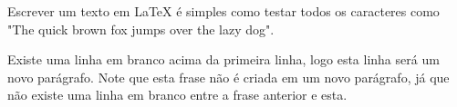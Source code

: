 \documentclass{article}
\begin{document}
	Escrever um texto em LaTeX é simples como testar todos os caracteres como "The quick brown fox jumps over the lazy dog".

	Existe uma linha em branco acima da primeira linha, logo esta linha será um novo parágrafo.
	Note que esta frase não é criada em um novo parágrafo, já que não existe uma linha em branco entre a frase anterior e esta.
\end{document}
